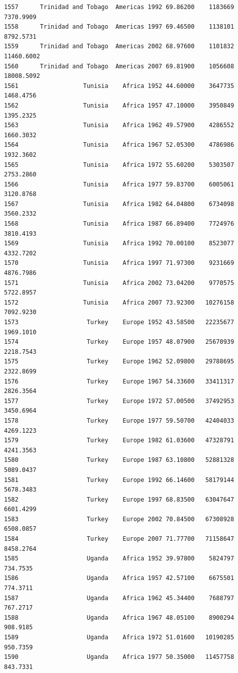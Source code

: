 \documentclass[
  letterpaper,
  DIV=11,
  numbers=noendperiod]{scrreprt}
\begin{document}
\begin{verbatim}
1557      Trinidad and Tobago  Americas 1992 69.86200    1183669   7370.9909
1558      Trinidad and Tobago  Americas 1997 69.46500    1138101   8792.5731
1559      Trinidad and Tobago  Americas 2002 68.97600    1101832  11460.6002
1560      Trinidad and Tobago  Americas 2007 69.81900    1056608  18008.5092
1561                  Tunisia    Africa 1952 44.60000    3647735   1468.4756
1562                  Tunisia    Africa 1957 47.10000    3950849   1395.2325
1563                  Tunisia    Africa 1962 49.57900    4286552   1660.3032
1564                  Tunisia    Africa 1967 52.05300    4786986   1932.3602
1565                  Tunisia    Africa 1972 55.60200    5303507   2753.2860
1566                  Tunisia    Africa 1977 59.83700    6005061   3120.8768
1567                  Tunisia    Africa 1982 64.04800    6734098   3560.2332
1568                  Tunisia    Africa 1987 66.89400    7724976   3810.4193
1569                  Tunisia    Africa 1992 70.00100    8523077   4332.7202
1570                  Tunisia    Africa 1997 71.97300    9231669   4876.7986
1571                  Tunisia    Africa 2002 73.04200    9770575   5722.8957
1572                  Tunisia    Africa 2007 73.92300   10276158   7092.9230
1573                   Turkey    Europe 1952 43.58500   22235677   1969.1010
1574                   Turkey    Europe 1957 48.07900   25670939   2218.7543
1575                   Turkey    Europe 1962 52.09800   29788695   2322.8699
1576                   Turkey    Europe 1967 54.33600   33411317   2826.3564
1577                   Turkey    Europe 1972 57.00500   37492953   3450.6964
1578                   Turkey    Europe 1977 59.50700   42404033   4269.1223
1579                   Turkey    Europe 1982 61.03600   47328791   4241.3563
1580                   Turkey    Europe 1987 63.10800   52881328   5089.0437
1581                   Turkey    Europe 1992 66.14600   58179144   5678.3483
1582                   Turkey    Europe 1997 68.83500   63047647   6601.4299
1583                   Turkey    Europe 2002 70.84500   67308928   6508.0857
1584                   Turkey    Europe 2007 71.77700   71158647   8458.2764
1585                   Uganda    Africa 1952 39.97800    5824797    734.7535
1586                   Uganda    Africa 1957 42.57100    6675501    774.3711
1587                   Uganda    Africa 1962 45.34400    7688797    767.2717
1588                   Uganda    Africa 1967 48.05100    8900294    908.9185
1589                   Uganda    Africa 1972 51.01600   10190285    950.7359
1590                   Uganda    Africa 1977 50.35000   11457758    843.7331

\end{verbatim}
\end{document}
